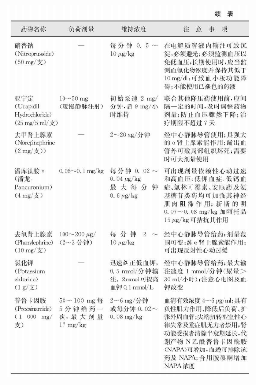 \begin{longtable}{c}
\includegraphics[width=\textwidth,height=\textheight,keepaspectratio]{./images/Image00328.jpg}\\

\end{longtable}
